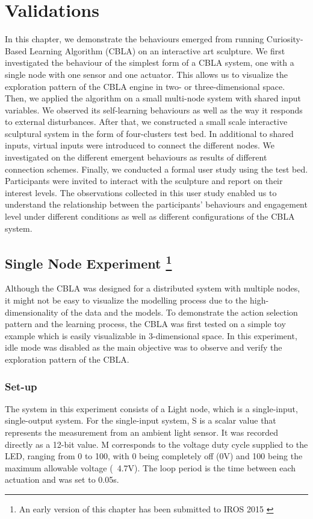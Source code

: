\chapter{Validations} \label{chap:validations}

In this chapter, we demonstrate the behaviours emerged from running Curiosity-Based Learning Algorithm (CBLA) on an interactive art sculpture. We first investigated the behaviour of the simplest form of a CBLA system, one with a single node with one sensor and one actuator. This allows us to visualize the exploration pattern of the CBLA engine in two- or three-dimensional space. Then, we applied the algorithm on a small multi-node system with shared input variables. We observed its self-learning behaviours as well as the way it responds to external disturbances. After that, we constructed a small scale interactive sculptural system in the form of four-clusters test bed. In additional to shared inputs, virtual inputs were introduced to connect the different nodes. We investigated on the different emergent behaviours as results of different connection schemes. Finally, we conducted a formal user study using the test bed. Participants were invited to interact with the sculpture and report on their interest levels. The observations collected in this user study enabled us to understand the relationship between the participants' behaviours and engagement level under different conditions as well as different configurations of the CBLA system.

\section[Single Node Experiment]
{Single Node Experiment
	\footnote{An early version of this chapter has been submitted to IROS 2015 \cite{Chan2015} }}\label{sec:single-node}

Although the CBLA was designed for a distributed system with multiple nodes, it might not be easy to visualize the modelling process due to the high-dimensionality of the data and the models. To demonstrate the action selection pattern and the learning process, the CBLA was first tested on a simple toy example which is easily visualizable in 3-dimensional space. In this experiment, idle mode was disabled as the main objective was to observe and verify the exploration pattern of the CBLA. 

\subsection{Set-up}
The system in this experiment consists of a Light node, which is a single-input, single-output system. For the single-input system, S is a scalar value that represents the measurement from an ambient light sensor. It was recorded directly as a 12-bit value. M corresponds to the voltage duty cycle supplied to the LED, ranging from 0 to 100, with 0 being completely off (0V) and 100 being the maximum allowable voltage (~4.7V). The loop period is the time between each actuation and was set to 0.05s.

